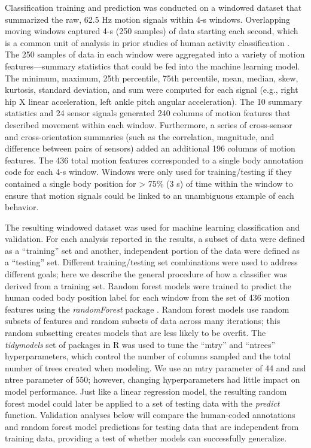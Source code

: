 \documentclass[
  man]{apa6}
\begin{document}
Classification training and prediction was conducted on a windowed dataset that summarized the raw, 62.5 Hz motion signals within 4-s windows. Overlapping moving windows captured 4-s (250 samples) of data starting each second, which is a common unit of analysis in prior studies of human activity classification \autocite{FranchakScott2021,NamPark2013,AiraksinenRasanen2020}. The 250 samples of data in each window were aggregated into a variety of motion features---summary statistics that could be fed into the machine learning model. The minimum, maximum, 25th percentile, 75th percentile, mean, median, skew, kurtosis, standard deviation, and sum were computed for each signal (e.g., right hip X linear acceleration, left ankle pitch angular acceleration). The 10 summary statistics and 24 sensor signals generated 240 columns of motion features that described movement within each window. Furthermore, a series of cross-sensor and cross-orientation summaries (such as the correlation, magnitude, and difference between pairs of sensors) added an additional 196 columns of motion features. The 436 total motion features corresponded to a single body annotation code for each 4-s window. Windows were only used for training/testing if they contained a single body position for \textgreater{} 75\% (3 s) of time within the window to ensure that motion signals could be linked to an unambiguous example of each behavior.

The resulting windowed dataset was used for machine learning classification and validation. For each analysis reported in the results, a subset of data were defined as a ``training'' set and another, independent portion of the data were defined as a ``testing'' set. Different training/testing set combinations were used to address different goals; here we describe the general procedure of how a classifier was derived from a training set. Random forest models \autocite{Breiman2001} were trained to predict the human coded body position label for each window from the set of 436 motion features using the \emph{randomForest} package \autocite{LiawWiener2002}. Random forest models use random subsets of features and random subsets of data across many iterations; this random subsetting creates models that are less likely to be overfit. The \emph{tidymodels} set of packages in R \autocite{tidymodels} was used to tune the ``mtry'' and ``ntrees'' hyperparameters, which control the number of columns sampled and the total number of trees created when modeling. We use an mtry parameter of 44 and and ntree parameter of 550; however, changing hyperparameters had little impact on model performance. Just like a linear regression model, the resulting random forest model could later be applied to a set of testing data with the \emph{predict} function. Validation analyses below will compare the human-coded annotations and random forest model predictions for testing data that are independent from training data, providing a test of whether models can successfully generalize.
\end{document}
